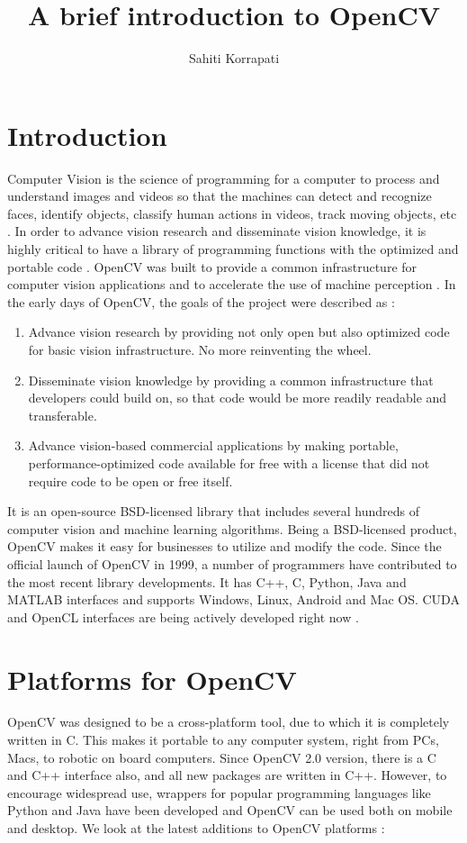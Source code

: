 \documentclass[9pt,twocolumn,twoside]{styles/osajnl}
\title{A brief introduction to OpenCV}
\author[1,*]{Sahiti Korrapati}
\affil[1]{School of Informatics and Computing, Bloomington, IN 47408, U.S.A.}
\affil[*]{Corresponding authors: sakorrap@iu.edu, S17-IR-2013}
\begin{document}
\maketitle
\section{Introduction}
Computer Vision is the science of programming for a computer to process and understand images and videos so that the machines can detect and recognize faces, identify objects, classify human actions in videos, track moving objects, etc \cite{www-about}. In order to advance vision research and disseminate vision knowledge, it is highly critical to have a library of programming functions with the optimized and portable code \cite{opencv-paper}. OpenCV was built to provide a common infrastructure for computer vision applications and to accelerate the use of machine perception \cite{www-about}. \newline In the early days of OpenCV, the goals of the project were described as \cite{www-opencv-wiki}:
\begin{enumerate}
    \item Advance vision research by providing not only open but also optimized code for basic vision infrastructure. No more reinventing the wheel.
    \item Disseminate vision knowledge by providing a common infrastructure that developers could build on, so that code would be more readily readable and transferable.
    \item Advance vision-based commercial applications by making portable, performance-optimized code available for free with a license that did not require code to be open or free itself.
\end{enumerate}

It is an open-source BSD-licensed library that includes several hundreds of computer vision and machine learning algorithms. Being a BSD-licensed product, OpenCV makes it easy for businesses to utilize and modify the code. Since the official launch of OpenCV in 1999, a number of programmers have contributed to the most recent library developments. It has C++, C, Python, Java and MATLAB interfaces and supports Windows, Linux, Android and Mac OS. CUDA and OpenCL interfaces are being actively developed right now \cite{www-about}.

\section{Platforms for OpenCV}
OpenCV was designed to be a cross-platform tool, due to which it is completely written in C. This makes it portable to any computer system, right from PCs, Macs, to robotic on board computers. Since OpenCV 2.0 version, there is a C and C++ interface also, and all new packages are written in C++. However, to encourage widespread use, wrappers for popular programming languages like Python and Java have been developed and OpenCV can be used both on mobile and desktop. We look at the latest additions to OpenCV platforms \cite{www-platforms}:
\end{document}
